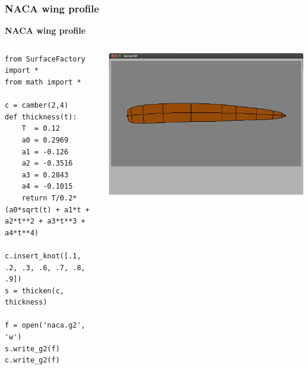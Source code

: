 \documentclass{beamer}
\theoremstyle{plain}
\theoremstyle{definition}
\begin{document}
\begin{frame}[fragile]
\frametitle{NACA wing profile}
\textbf{NACA wing profile}

\begin{columns}
    \begin{column}{.50\linewidth}
        \begin{listing}[H]
            \tiny
            \begin{verbatim}
from SurfaceFactory import *
from math import *

c = camber(2,4)
def thickness(t):
    T  = 0.12
    a0 = 0.2969
    a1 = -0.126
    a2 = -0.3516
    a3 = 0.2843
    a4 = -0.1015
    return T/0.2*(a0*sqrt(t) + a1*t + a2*t**2 + a3*t**3 + a4*t**4)
    
c.insert_knot([.1, .2, .3, .6, .7, .8, .9])
s = thicken(c, thickness)

f = open('naca.g2', 'w')
s.write_g2(f)
c.write_g2(f)

            \end{verbatim}
        \end{listing}
    \end{column}
    \begin{column}{.45\linewidth}
        \includegraphics[width=\linewidth]{naca3}
    \end{column}
\end{columns}
\end{frame}

\end{document}
